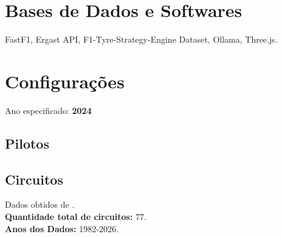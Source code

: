 \documentclass[12pt]{article}
\begin{document}
\section*{Bases de Dados e Softwares}
FastF1, Ergast API, F1-Tyre-Strategy-Engine Dataset, Ollama, Three.js.

\newpage
\section{Configurações}
Ano especificado: \textbf{2024}
\subsection{Pilotos}
\subsection{Circuitos}
Dados obtidos de \cite{trotman_formula1}.\\
\textbf{Quantidade total de circuitos:} 77.\\
\textbf{Anos dos Dados:} 1982-2026.
\end{document}
